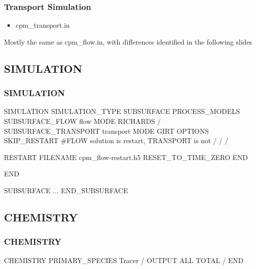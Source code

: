 \documentclass{beamer}
\newcommand\bluecomment[1]{{{\color{blue} #1}}}
\newcommand\magentacomment[1]{{{\color{magenta} #1}}}
\begin{document}
\begin{frame} [fragile,]\frametitle{Transport Simulation}
	\begin{itemize}
		\item cpm\_transport.in
	\end{itemize}
	
	Mostly the same as cpm\_flow.in, with differences identified in the following slides
\end{frame}

\subsection{SIMULATION}

\begin{frame}\frametitle{SIMULATION}

	\begin{semiverbatim}
SIMULATION
  SIMULATION_TYPE SUBSURFACE
  PROCESS_MODELS
    SUBSURFACE_FLOW flow
    MODE RICHARDS
  /
  \magentacomment{SUBSURFACE_TRANSPORT transport
    MODE GIRT
    OPTIONS
      SKIP_RESTART \bluecomment{#FLOW solution is restart, 
      	            TRANSPORT is not}
    /
  /}
/



  \magentacomment{RESTART
    FILENAME cpm_flow-restart.h5
    RESET_TO_TIME_ZERO
  END}

END

SUBSURFACE
...
END_SUBSURFACE
	\end{semiverbatim}
\end{frame}


\subsection{CHEMISTRY}
\begin{frame}\frametitle{CHEMISTRY}
	
	\begin{semiverbatim}
CHEMISTRY
  PRIMARY_SPECIES
    Tracer
  /
  OUTPUT
    ALL
    TOTAL
  /
END
	\end{semiverbatim}
\end{frame}

\end{document}
